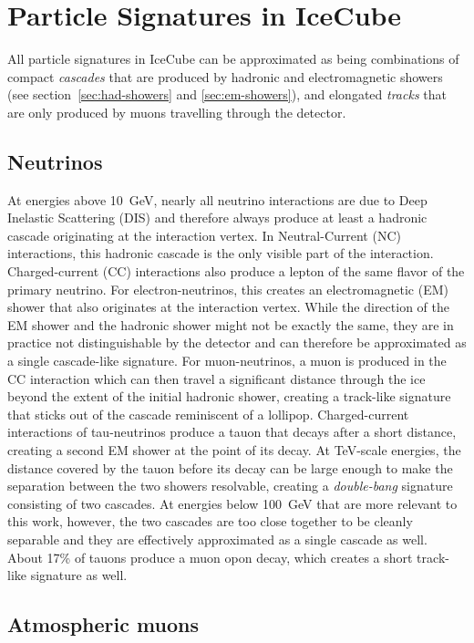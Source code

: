 \section{Particle Signatures in IceCube}

All particle signatures in IceCube can be approximated as being combinations of compact \emph{cascades} that are produced by hadronic and electromagnetic showers (see section~\ref{sec:had-showers} and \ref{sec:em-showers}), and elongated \emph{tracks} that are only produced by muons travelling through the detector.

\subsection{Neutrinos}

At energies above 10~GeV, nearly all neutrino interactions are due to Deep Inelastic Scattering (DIS) and therefore always produce at least a hadronic cascade originating at the interaction vertex. In Neutral-Current (NC) interactions, this hadronic cascade is the only visible part of the interaction. Charged-current (CC) interactions also produce a lepton of the same flavor of the primary neutrino. For electron-neutrinos, this creates an electromagnetic (EM) shower that also originates at the interaction vertex. While the direction of the EM shower and the hadronic shower might not be exactly the same, they are in practice not distinguishable by the detector and can therefore be approximated as a single cascade-like signature. For muon-neutrinos, a muon is produced in the CC interaction which can then travel a significant distance through the ice beyond the extent of the initial hadronic shower, creating a track-like signature that sticks out of the cascade reminiscent of a lollipop. Charged-current interactions of tau-neutrinos produce a tauon that decays after a short distance, creating a second EM shower at the point of its decay. At TeV-scale energies, the distance covered by the tauon before its decay can be large enough to make the separation between the two showers resolvable, creating a \emph{double-bang} signature consisting of two cascades. At energies below 100~GeV that are more relevant to this work, however, the two cascades are too close together to be cleanly separable and they are effectively approximated as a single cascade as well. About 17\% of tauons produce a muon opon decay, which creates a short track-like signature as well.

\subsection{Atmospheric muons}

